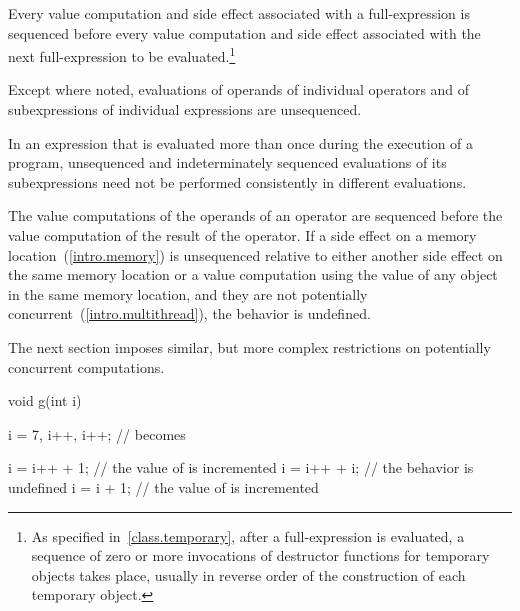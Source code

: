 \pnum
Every
%
value computation and
%
side effect associated with a full-expression is
sequenced before every value computation and side effect associated with the
next full-expression to be evaluated.\footnote{As specified
in~\ref{class.temporary}, after a full-expression is evaluated, a sequence of
zero or more invocations of destructor functions for temporary objects takes
place, usually in reverse order of the construction of each temporary object.}

\pnum
{}%
Except where noted, evaluations of operands of individual operators and
of subexpressions of individual expressions are unsequenced. \begin{note}
In an expression that is evaluated more than once during the execution
of a program, unsequenced and indeterminately sequenced evaluations of
its subexpressions need not be performed consistently in different
evaluations. \end{note} The value computations of the operands of an
operator are sequenced before the value computation of the result of the
operator. If a
%
side effect on a memory location~(\ref{intro.memory}) is unsequenced
relative to either another side effect on the same memory location or
a value computation using the value of any object in the same memory location,
and they are not potentially concurrent~(\ref{intro.multithread}),
the behavior is undefined.
\begin{note}
The next section imposes similar, but more complex restrictions on
potentially concurrent computations.
\end{note}

\begin{example}

\begin{codeblock}
void g(int i) {
  i = 7, i++, i++;    //  becomes 

  i = i++ + 1;        // the value of  is incremented
  i = i++ + i;        // the behavior is undefined
  i = i + 1;          // the value of  is incremented
}
\end{codeblock}
\end{example}

